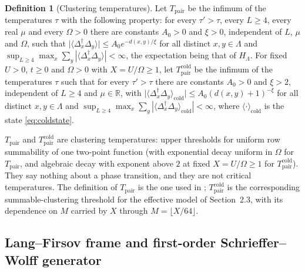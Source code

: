 \documentclass[11pt]{article}
\theoremstyle{plain}
\theoremstyle{definition}
\newtheorem{definition}{Definition}
\newcommand{\Dop}{\Delta}
\begin{document}
\begin{definition}[Clustering temperatures]\label{def:tpair}
Let $T_{\mathrm{pair}}$ be the infimum of the temperatures $\tau$ with the
following property: for every $\tau'>\tau$, every $L\ge4$, every real $\mu$ and
every $\Omega>0$ there are constants $A_0>0$ and $\xi>0$, independent of $L$,
$\mu$ and $\Omega$, such that
$\bigl|\langle\Dop_x^\dagger\Dop_y\rangle\bigr|\le A_0e^{-d(x,y)/\xi}$ for all
distinct $x,y\in\Lambda$ and
$\sup_{L\ge4}\max_x\sum_{y}|\langle\Dop_x^\dagger\Dop_y\rangle|<\infty$, the
expectation being that of $H_\Lambda$. For fixed $U>0$, $t\ge0$ and $\Omega>0$
with $X=U/\Omega\ge1$, let $T_{\mathrm{pair}}^{\mathrm{cold}}$ be the infimum of
the temperatures $\tau$ such that for every $\tau'>\tau$ there are constants
$A_0>0$ and $\xi>2$, independent of $L\ge4$ and $\mu\in\mathbb{R}$, with
$\bigl|\langle\Dop_x^\dagger\Dop_y\rangle_{\mathrm{cold}}\bigr|\le A_0(d(x,y)+1)^{-\xi}$
for all distinct $x,y\in\Lambda$ and
$\sup_{L\ge4}\max_x\sum_{y}|\langle\Dop_x^\dagger\Dop_y\rangle_{\mathrm{cold}}|<\infty$,
where $\langle\cdot\rangle_{\mathrm{cold}}$ is the state \eqref{eq:coldstate}.
\end{definition}

$T_{\mathrm{pair}}$ and $T_{\mathrm{pair}}^{\mathrm{cold}}$ are clustering
temperatures: upper thresholds for uniform row summability of one two-point
function (with exponential decay uniform in $\Omega$ for $T_{\mathrm{pair}}$, and
algebraic decay with exponent above $2$ at fixed $X=U/\Omega\ge1$ for
$T_{\mathrm{pair}}^{\mathrm{cold}}$). They say nothing about a phase transition,
and they are not critical temperatures. The definition of $T_{\mathrm{pair}}$ is
the one used in \cite{rens2026a,rens2026strong}; $T_{\mathrm{pair}}^{\mathrm{cold}}$
is the corresponding summable-clustering threshold for the effective model of
Section~2.3, with its dependence on $M$ carried by $X$ through
$M=\lfloor X/64\rfloor$.

\subsection{Lang--Firsov frame and first-order Schrieffer--Wolff generator}\label{sec:lf}
\end{document}
